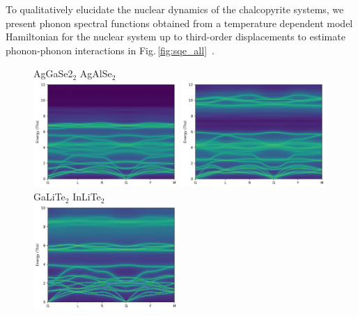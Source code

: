 To qualitatively elucidate the nuclear dynamics of the chalcopyrite systems, we present phonon spectral functions obtained from a temperature dependent model Hamiltonian for the nuclear system up to third-order displacements to estimate phonon-phonon interactions in Fig.\,\ref{fig:sqe_all}~\cite{Hellman.2013,Hellman.2013b,Squires}.
%
\begin{figure}
	\centering
	AgGaSe2$_2$ \hspace{3.7cm} AgAlSe$_2$\\
	\includegraphics[width=0.49\textwidth]{./data/plots/spectral_functions/122.04.AgGaSe2.12.png}
	\includegraphics[width=0.49\textwidth]{./data/plots/spectral_functions/122.04.AgAlSe2.12.png}
	\\
	GaLiTe$_2$ \hspace{3.7cm} InLiTe$_2$\\
	\includegraphics[width=0.49\textwidth]{./data/plots/spectral_functions/122.04.GaLiTe2.png}

\end{figure}
